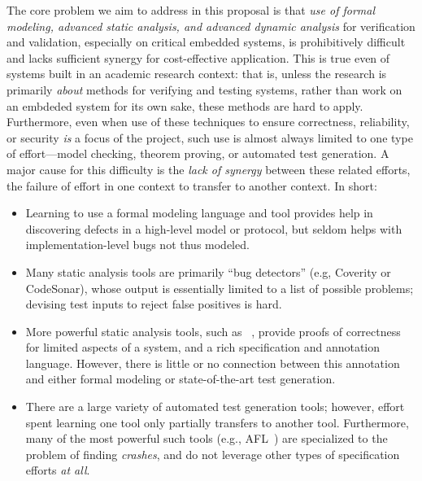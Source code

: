 The core problem we aim to address in this proposal is that \emph{use of formal modeling, advanced static analysis, and advanced dynamic analysis} for verification and validation, especially on critical embedded systems, is prohibitively difficult and lacks sufficient synergy for cost-effective application.  This is true even of systems built in an academic research context: that is, unless the research is primarily \emph{about} methods for verifying and testing systems, rather than work on an embdeded system for its own sake, these methods are hard to apply.  Furthermore, even when use of these techniques to ensure correctness, reliability, or security \emph{is} a focus of the project, such use is almost always limited to one type of effort---model checking, theorem proving, or automated test generation.  A major cause for this difficulty is the \emph{lack of synergy} between these related efforts, the failure of effort in one context to transfer to another context.  In short:

\begin{itemize}[labelsep=3pt,leftmargin=12pt]
\item Learning to use a formal modeling language and tool
 provides help in discovering defects in a high-level model or protocol, but seldom helps with implementation-level bugs not thus modeled.
\item Many static analysis tools are primarily ``bug detectors'' (e.g, Coverity or CodeSonar), whose output is essentially limited to a list of possible problems; devising test inputs to reject false positives is hard.
\item More powerful static analysis tools, such as \framac~\cite{KKP2015:FAC}, provide proofs of correctness for limited aspects of a system, and a rich specification and annotation language.  However, there is little or no connection between this annotation and either formal modeling or state-of-the-art test generation.
\item There are a large variety of automated test generation tools; however, effort spent learning one tool only partially transfers to another tool.  Furthermore, many of the most powerful such tools (e.g., AFL~\cite{aflfuzz}) are specialized to the problem of finding \emph{crashes}, and do not leverage  other types of specification efforts \emph{at all}.
\end{itemize}

